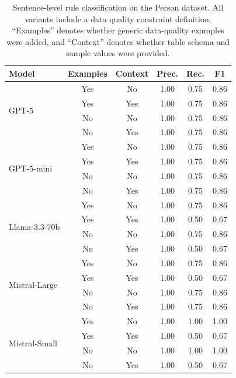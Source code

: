 \begin{table}[htbp]
\centering
\small
\caption{Sentence-level rule classification on the Person dataset. All variants include a data quality constraint definition; ``Examples'' denotes whether generic data-quality examples were added, and ``Context'' denotes whether table schema and sample values were provided.}
\label{tab:classification_results_person}
\begin{tabular}{@{}lccccc@{}}
\toprule
\textbf{Model} & \textbf{Examples} & \textbf{Context} & \textbf{Prec.} & \textbf{Rec.} & \textbf{F1} \\
\midrule
\multirow{4}{*}{GPT-5} & Yes & No & 1.00 & 0.75 & 0.86 \\
 & Yes & Yes & 1.00 & 0.75 & 0.86 \\
 & No & No & 1.00 & 0.75 & 0.86 \\
 & No & Yes & 1.00 & 0.75 & 0.86 \\
\cmidrule(lr){1-6}
\multirow{4}{*}{GPT-5-mini} & Yes & No & 1.00 & 0.75 & 0.86 \\
 & Yes & Yes & 1.00 & 0.75 & 0.86 \\
 & No & No & 1.00 & 0.75 & 0.86 \\
 & No & Yes & 1.00 & 0.75 & 0.86 \\
\cmidrule(lr){1-6}
\multirow{4}{*}{Llama-3.3-70b} & Yes & No & 1.00 & 0.75 & 0.86 \\
 & Yes & Yes & 1.00 & 0.50 & 0.67 \\
 & No & No & 1.00 & 0.75 & 0.86 \\
 & No & Yes & 1.00 & 0.50 & 0.67 \\
\cmidrule(lr){1-6}
\multirow{4}{*}{Mistral-Large} & Yes & No & 1.00 & 0.75 & 0.86 \\
 & Yes & Yes & 1.00 & 0.50 & 0.67 \\
 & No & No & 1.00 & 0.75 & 0.86 \\
 & No & Yes & 1.00 & 0.75 & 0.86 \\
\cmidrule(lr){1-6}
\multirow{4}{*}{Mistral-Small} & Yes & No & 1.00 & 1.00 & 1.00 \\
 & Yes & Yes & 1.00 & 0.50 & 0.67 \\
 & No & No & 1.00 & 1.00 & 1.00 \\
 & No & Yes & 1.00 & 0.50 & 0.67 \\
\bottomrule
\end{tabular}
\end{table}